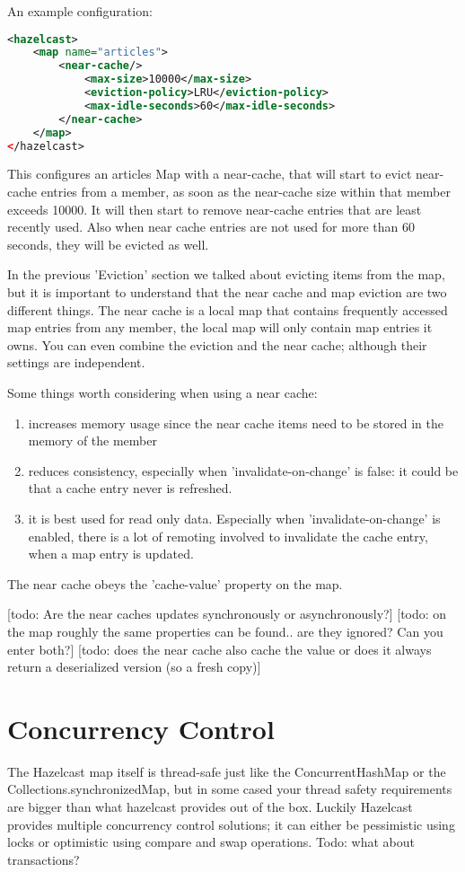 An example configuration:
\begin{lstlisting}[language=xml]
<hazelcast>
    <map name="articles">
        <near-cache/>
            <max-size>10000</max-size>
            <eviction-policy>LRU</eviction-policy>
            <max-idle-seconds>60</max-idle-seconds>
        </near-cache>
    </map>
</hazelcast>
\end{lstlisting}
This configures an articles Map with a near-cache, that will start to evict near-cache entries from a member, as soon as the near-cache size within that member exceeds 10000. It will then start to remove near-cache entries that are least recently used. Also when near cache entries are not used for more than 60 seconds, they will be evicted as well.

In the previous 'Eviction' section we talked about evicting items from the map, but it is important to understand that the near cache and map eviction are two different things. The near cache is a local map that contains frequently accessed map entries from any member, the local map will only contain map entries it owns. You can even combine the eviction and the near cache; although their settings are independent. 

Some things worth considering when using a near cache:
\begin{enumerate}
\item increases memory usage since the near cache items need to be stored in the memory of the member
\item reduces consistency, especially when 'invalidate-on-change' is false: it could be that a cache entry never is refreshed.
\item it is best used for read only data. Especially when 'invalidate-on-change' is enabled, there is a lot of remoting involved to invalidate the cache entry, when a map entry is updated.
\end{enumerate}

The near cache obeys the 'cache-value' property on the map.

[todo: Are the near caches updates synchronously or asynchronously?]
[todo: on the map roughly the same properties can be found.. are they ignored? Can you enter both?]
[todo: does the near cache also cache the value or does it always return a deserialized version (so a fresh copy)]

\section{Concurrency Control}
The Hazelcast map itself is thread-safe just like the ConcurrentHashMap or the Collections.synchronizedMap, but in some cased your thread safety requirements are bigger than what hazelcast provides out of the box. Luckily Hazelcast provides multiple concurrency control solutions;  it can either be pessimistic using locks or optimistic using compare and swap operations. Todo: what about transactions?

